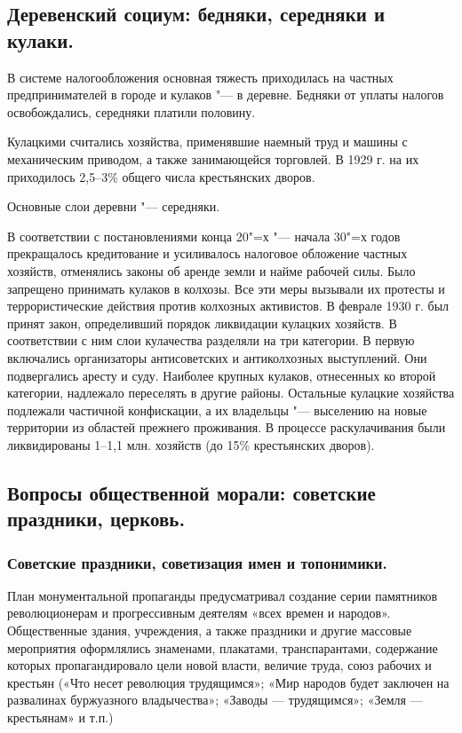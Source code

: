 \subsection{Деревенский социум: бедняки, середняки и кулаки.}

В системе налогообложения основная тяжесть приходилась на частных предпринимателей в городе и кулаков "--- в деревне. Бедняки от уплаты налогов освобождались, середняки платили половину.

Кулацкими считались хозяйства, применявшие наемный труд и машины с механическим приводом, а также занимающейся торговлей. В 1929 г. на их приходилось 2,5--3\% общего числа крестьянских дворов.

Основные слои деревни "--- середняки.

В соответствии с постановлениями конца 20"=х "--- начала 30"=х годов прекращалось кредитование и усиливалось налоговое обложение частных хозяйств, отменялись законы об аренде земли и найме рабочей силы. Было запрещено принимать кулаков в колхозы. Все эти меры вызывали их протесты и террористические действия против колхозных активистов. В феврале 1930 г. был принят закон, определивший порядок ликвидации кулацких хозяйств. В соответствии с ним слои кулачества разделяли на три категории. В первую включались организаторы антисоветских и антиколхозных выступлений. Они подвергались аресту и суду. Наиболее крупных кулаков, отнесенных ко второй категории, надлежало переселять в другие районы. Остальные кулацкие хозяйства подлежали частичной конфискации, а их владельцы "--- выселению на новые территории из областей прежнего проживания. В процессе раскулачивания были ликвидированы 1--1,1 млн. хозяйств (до 15\% крестьянских дворов).

\subsection{Вопросы общественной морали: советские праздники, церковь.}

\subsubsection{\textbf{Советские праздники, советизация имен и топонимики.}}

План монументальной пропаганды предусматривал создание серии памятников революционерам и прогрессивным деятелям «всех времен и народов». Общественные здания, учреждения, а также праздники и другие массовые мероприятия оформлялись знаменами, плакатами, транспарантами, содержание которых пропагандировало цели новой власти, величие труда, союз рабочих и крестьян («Что несет революция трудящимся»; «Мир народов будет заключен на развалинах буржуазного владычества»; «Заводы — трудящимся»; «Земля — крестьянам» и т.п.)

